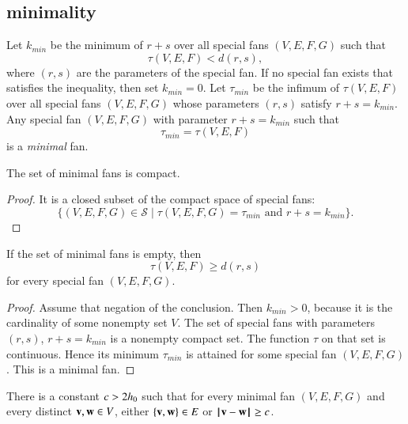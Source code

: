 \subsection{minimality}


\begin{definition}
Let $k_{min}$ be the minimum of $r+s$ over
all special fans $(V,E,F,G)$ such that 
\begin{equation}\label{eqn:kmin}
\tau(V,E,F) < d (r,s),
\end{equation}
where $(r,s)$ are the parameters of the special fan.
If no special fan exists that satisfies the inequality, then set $k_{min}=0$.
Let $\tau_{min}$ be the infimum of $\tau(V,E,F)$ over all special fans
$(V,E,F,G)$ whose parameters $(r,s)$ satisfy $r+s=k_{min}$.
Any special fan $(V,E,F,G)$ with parameter $r+s=k_{min}$ such that
$$
\tau_{min}= \tau(V,E,F)
$$
is a {\it minimal}  fan.
\end{definition}

\begin{lemma}
The set of minimal fans is compact.
\end{lemma}

\begin{proof}  It is a closed subset of the compact space of special fans:
$$
\{(V,E,F,G)\in {\mathcal S} \mid \tau(V,E,F,G)=\tau_{min} \text{ and }
   r+s = k_{min}\}.
$$ 
\end{proof}

\begin{lemma}\label{lemma:empty-d}
If the set of minimal fans is empty, then
$$
\tau(V,E,F) \ge d (r,s)
$$
for every special fan $(V,E,F,G)$.
\end{lemma}

\begin{proof} Assume that negation of the conclusion.  
Then $k_{min}>0$, because it is the cardinality of some nonempty set $V$.
The set of special fans with parameters $(r,s)$, $r+s=k_{min}$ is a nonempty 
compact
set.  The function $\tau$ on that set is continuous.  Hence its minimum
$\tau_{min}$ is attained for some special fan $(V,E,F,G)$.  This is a minimal fan.
\end{proof}

\begin{lemma}
There is a constant $c>2{h_0}$ such that for every minimal fan $(V,E,F,G)$
and every distinct ${\mathbf v},{\mathbf w}\in V$, either $\{{\mathbf v},{\mathbf w}\}\in E$ or ${\hskip0.1em|\hskip-0.15em|\hskip0.1em}{\mathbf v} - {\mathbf w}{\hskip0.1em|\hskip-0.15em|\hskip0.1em}\ge c$.
\end{lemma}


